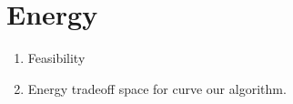 \section{Energy}
{\color{red}
\begin{enumerate}
\item Feasibility
\item Energy tradeoff space for curve our algorithm.
\end{enumerate}}